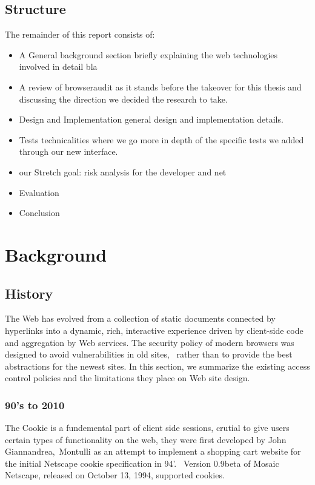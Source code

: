 \documentclass[a4paper,12pt]{paper}
\begin{document}
\subsection{Structure}
The remainder of this report consists of:
\begin{itemize}
 \item A General background section briefly explaining the web technologies involved in detail bla
 \item A review of browseraudit as it stands before the takeover for this thesis and discussing the direction we decided the research to take.
 \item Design and Implementation general design and implementation details.
 \item Tests technicalities where we go more in depth of the specific tests we added through our new interface.
 \item our Stretch goal: risk analysis for the developer and net 
 \item Evaluation
 \item Conclusion
\end{itemize}



\section{Background}

\subsection{History}

The Web has evolved from a collection of static documents connected by hyperlinks into a dynamic, rich, interactive experience
driven by client-side code and aggregation by Web services. The security policy of modern browsers was designed to avoid vulnerabilities in old sites, \
rather than to provide the best abstractions for the newest sites. In this section, we summarize the existing access
control policies and the limitations they place on Web site design.



\subsubsection{90's to 2010}

The Cookie is a fundemental part of client side sessions, crutial to give users certain types of functionality on the web, they were first developed by John Giannandrea,\
Montulli as an attempt to implement a shopping cart website for the initial Netscape cookie specification in 94'. \
Version 0.9beta of Mosaic Netscape, released on October 13, 1994, supported cookies.\
\end{document}
